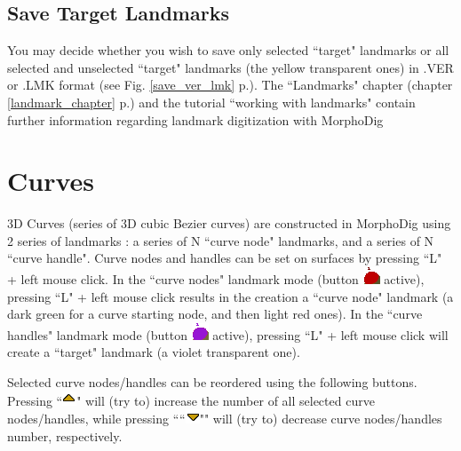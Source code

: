 \subsection{Save Target Landmarks}
You may decide whether you wish to save only selected ``target" landmarks or all selected and
unselected ``target" landmarks (the yellow transparent ones) in .VER or .LMK format (see Fig. \ref{save_ver_lmk} p.\pageref{save_ver_lmk}).
The ``Landmarks" chapter (chapter \ref{landmark_chapter} p.\pageref{landmark_chapter}) and the tutorial ``working with landmarks" contain further information regarding landmark digitization with MorphoDig


\section{Curves}\label{file_curve_section}

3D Curves (series of 3D cubic Bezier curves) are constructed in MorphoDig using 2 series of landmarks : a series of N ``curve node" landmarks, and a series of N ``curve handle".  Curve nodes and handles can be set on surfaces by pressing ``L" + left mouse click. In the ``curve nodes" landmark mode (button \includegraphics[scale=0.7]{images/04/curve_nodes.png} active), pressing ``L" + left mouse click results in the creation a ``curve node" landmark (a dark green for a curve starting node, and then light red ones). In the ``curve handles" landmark mode (button \includegraphics[scale=0.7]{images/04/curve_handles.png} active), pressing ``L" + left mouse click will create a ``target" landmark (a violet transparent one).

Selected curve nodes/handles can be reordered using the following buttons. Pressing ``\includegraphics[scale=0.7]{images/06/objects/move_up.png}"
will (try to) increase the number of all selected curve nodes/handles, while pressing ````\includegraphics[scale=0.7]{images/06/objects/move_down.png}""
will (try to) decrease curve nodes/handles number, respectively.\\


